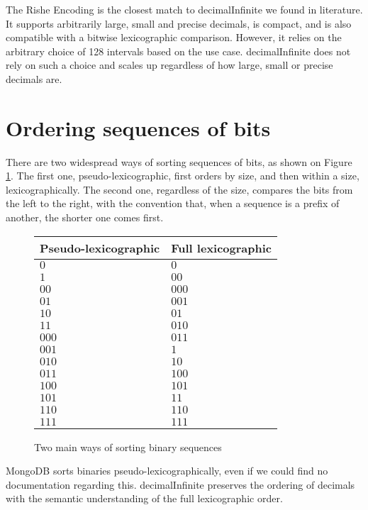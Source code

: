 \documentclass{acm_proc_article-sp}
\begin{document}
The Rishe Encoding \cite{Rishe1992} is the closest match to decimalInfinite we found in literature. It supports arbitrarily large, small and precise decimals, is compact, and is also compatible with a bitwise lexicographic comparison. However, it relies on the arbitrary choice of 128 intervals based on the use case. decimalInfinite does not rely on such a choice and scales up regardless of how large, small or precise decimals are.

\section{Ordering sequences of bits}

There are two widespread ways of sorting sequences of bits, as shown on Figure \ref{figure-orders}. The first one, pseudo-lexicographic, first orders by size, and then within a size, lexicographically. The second one, regardless of the size, compares the bits from the left to the right, with the convention that, when a sequence is a prefix of another, the shorter one comes first.

\begin{figure}
\caption{Two main ways of sorting binary sequences}
\label{figure-orders}
\center
\begin{tabular}{|l|l|}
\hline
Pseudo-lexicographic & Full lexicographic \\
\hline
$0$ & $0$ \\
$1$ & $00$ \\
$00$ & $000$ \\
$01$ & $001$ \\
$10$ & $01$ \\
$11$ & $010$ \\
$000$ & $011$ \\
$001$ & $1$ \\
$010$ & $10$ \\
$011$ & $100$ \\
$100$ & $101$ \\
$101$ & $11$ \\
$110$ & $110$ \\
$111$ & $111$ \\
\hline
\end{tabular}
\end{figure}

MongoDB sorts binaries pseudo-lexicographically, even if we could find no documentation regarding this. decimalInfinite preserves the ordering of decimals with the semantic understanding of the full lexicographic order.
\end{document}
